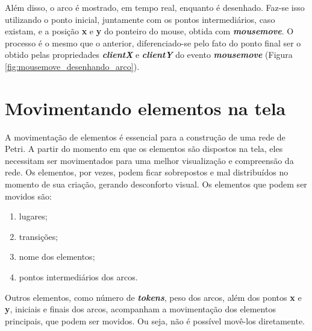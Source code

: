 \documentclass[
	12pt,				%
	openright,			%
	oneside,			%
	a4paper,			%
	english,			%
	brazil				%
	]{abntex2}
\theoremstyle{doispontos}
\begin{document}
Além disso, o arco é mostrado, em tempo real, enquanto é desenhado. Faz-se isso utilizando o ponto inicial, juntamente com os pontos intermediários, caso existam, e a posição \textbf{x} e \textbf{y} do ponteiro do mouse, obtida com \textbf{\textit{mousemove}}. O processo é o mesmo que o anterior, diferenciado-se pelo fato do ponto final ser o obtido pelas propriedades \textbf{\textit{clientX}} e \textbf{\textit{clientY}} do evento \textbf{\textit{mousemove}} (Figura \ref{fig:mousemove_desenhando_arco}). 

\section{Movimentando elementos na tela}\label{cap:move_elements}

A movimentação de elementos é essencial para a construção de uma rede de Petri. A partir do momento em que os elementos são dispostos na tela, eles necessitam ser movimentados para uma melhor visualização e compreensão da rede. Os elementos, por vezes, podem ficar sobrepostos e mal distribuídos no momento de sua criação, gerando desconforto visual. Os elementos que podem ser movidos são: 

\begin{enumerate}
	\item lugares;
	\item transições;
	\item nome dos elementos;
	\item pontos intermediários dos arcos.
\end{enumerate}

Outros elementos, como número de \textbf{\textit{tokens}}, peso dos arcos, além dos pontos \textbf{x} e \textbf{y}, iniciais e finais dos arcos, acompanham a movimentação dos elementos principais, que podem ser movidos. Ou seja, não é possível movê-los diretamente.
\end{document}
